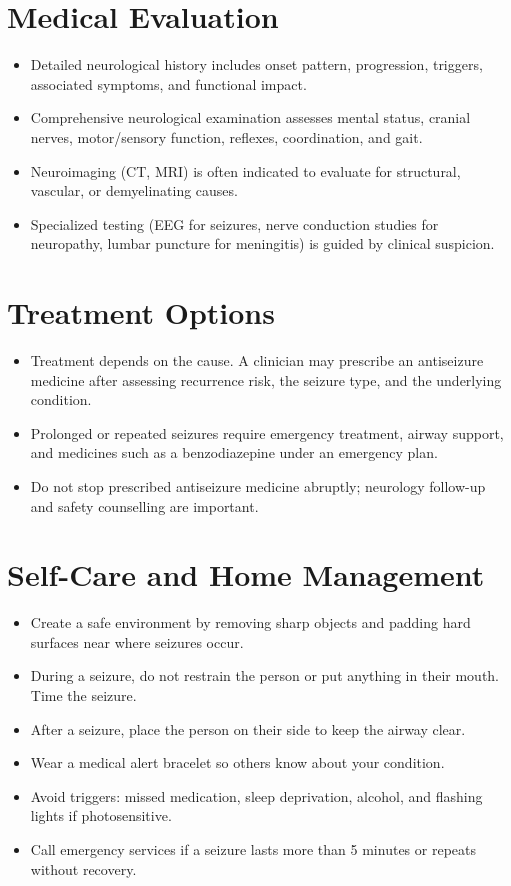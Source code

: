 \section*{Medical Evaluation}
\begin{itemize}
  \item Detailed neurological history includes onset pattern, progression, triggers, associated symptoms, and functional impact.
  \item Comprehensive neurological examination assesses mental status, cranial nerves, motor/sensory function, reflexes, coordination, and gait.
  \item Neuroimaging (CT, MRI) is often indicated to evaluate for structural, vascular, or demyelinating causes.
  \item Specialized testing (EEG for seizures, nerve conduction studies for neuropathy, lumbar puncture for meningitis) is guided by clinical suspicion.
\end{itemize}

\section*{Treatment Options}
\begin{itemize}
  \item Treatment depends on the cause. A clinician may prescribe an antiseizure medicine after assessing recurrence risk, the seizure type, and the underlying condition.
  \item Prolonged or repeated seizures require emergency treatment, airway support, and medicines such as a benzodiazepine under an emergency plan.
  \item Do not stop prescribed antiseizure medicine abruptly; neurology follow-up and safety counselling are important.
\end{itemize}

\section*{Self-Care and Home Management}
\begin{itemize}
  \item Create a safe environment by removing sharp objects and padding hard surfaces near where seizures occur.
  \item During a seizure, do not restrain the person or put anything in their mouth. Time the seizure.
  \item After a seizure, place the person on their side to keep the airway clear.
  \item Wear a medical alert bracelet so others know about your condition.
  \item Avoid triggers: missed medication, sleep deprivation, alcohol, and flashing lights if photosensitive.
  \item Call emergency services if a seizure lasts more than 5 minutes or repeats without recovery.
\end{itemize}

